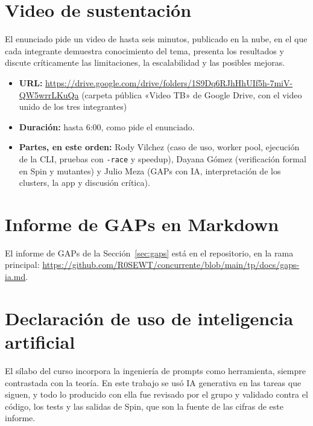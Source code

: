 \section{Video de sustentación}\label{anexo:video}

El enunciado pide un video de hasta seis minutos, publicado en la nube, en el que cada integrante
demuestra conocimiento del tema, presenta los resultados y discute críticamente las limitaciones, la
escalabilidad y las posibles mejoras.

\begin{itemize}
  \item \textbf{URL:} \url{https://drive.google.com/drive/folders/1S9Dq6RJhHhUIf5h-7miV-QW5wrrLKuQa}
        (carpeta pública «Video TB» de Google Drive, con el video unido de los tres integrantes)
  \item \textbf{Duración:} hasta 6:00, como pide el enunciado.
  \item \textbf{Partes, en este orden:} Rody Vilchez (caso de uso, worker pool, ejecución de la CLI,
        pruebas con \texttt{-race} y speedup), Dayana Gómez (verificación formal en Spin y
        mutantes) y Julio Meza (GAPs con IA, interpretación de los clusters, la app y discusión
        crítica).
\end{itemize}

\section{Informe de GAPs en Markdown}\label{anexo:gaps}

El informe de GAPs de la Sección~\ref{sec:gaps} está en el repositorio, en la rama principal:
\url{https://github.com/R0SEWT/concurrente/blob/main/tp/docs/gaps-ia.md}.

\section{Declaración de uso de inteligencia artificial}\label{anexo:ia}

El sílabo del curso incorpora la ingeniería de prompts como herramienta, siempre contrastada con la
teoría. En este trabajo se usó IA generativa en las tareas que siguen, y todo lo producido con ella
fue revisado por el grupo y validado contra el código, los tests y las salidas de Spin, que son la
fuente de las cifras de este informe.

